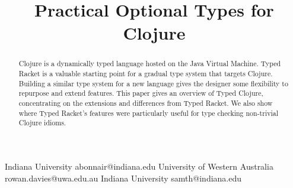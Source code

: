 \documentclass[preprint,9pt]{sigplanconf}
\theoremstyle{remark}
\theoremstyle{remark}
\begin{document}
\setlength{\pdfpageheight}{\paperheight}
\setlength{\pdfpagewidth}{\paperwidth}






\title{Practical Optional Types for Clojure}

           {Indiana University}
           {abonnair@indiana.edu}
           {University of Western Australia}
           {rowan.davies@uwa.edu.au}
           {Indiana University}
           {samth@indiana.edu}

\maketitle

\begin{abstract}
Clojure is a dynamically typed language hosted on the Java 
Virtual Machine.
Typed Racket is a valuable starting point for
a gradual type system that targets Clojure.
Building a similar type system for a new language gives the
designer some flexibility to repurpose and extend features.
This paper gives an overview of Typed Clojure, concentrating
on the extensions and differences from Typed Racket. We also
show where Typed Racket's features were particularly useful
for type checking non-trivial Clojure idioms.
\end{abstract}


\end{document}
